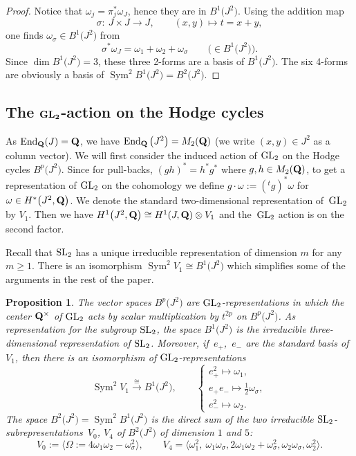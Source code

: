 \documentclass[10pt,a4paper]{amsart}
\numberwithin{equation}{section}
\newtheorem{Proposition}[Theorem]{Proposition}
 { \theoremstyle{definition}
\newtheorem{Definition}[Theorem]{Definition}
\newtheorem{Note}[Theorem]{Note}
\newtheorem{Example}[Theorem]{Example}
\newtheorem{Remark}[Theorem]{Remark} }
\begin{document}
\begin{proof}
Notice that $\omega_j=\pi_j^*\omega_J$, hence they are in $B^1\big(J^2\big)$. Using the addition map
\[
\sigma \colon \ J\times J \longrightarrow J,\qquad
(x,y)\longmapsto t=x+y,
\]
one finds $\omega_\sigma\in B^1\big(J^2\big)$ from
\[
\sigma^*\omega_J =
\omega_1+\omega_2+\omega_\sigma\qquad\big(\!\!\in B^1\big(J^2\big)\big).
\]
Since $\dim B^1\big(J^2\big)=3$, these three 2-forms are a basis of $B^1\big(J^2\big)$.
The six 4-forms are obviously a basis of $\operatorname{Sym}^2B^1\big(J^2\big)= B^2\big(J^2\big)$.
\end{proof}

\subsection[The GL\_2-action on the Hodge cycles]{The $\boldsymbol{{\rm GL}_2}$-action on the Hodge cycles}\label{GL2Hodge}

As $\operatorname{End}_{\bf Q}(J)={\bf Q}$, we have $\operatorname{End}_{\bf Q}\big(J^2\big)=M_2({\bf Q})$ (we write $(x,y)\in J^2$ as
a column vector).
We will first consider the induced action of ${\rm GL}_2$ on the Hodge cycles $B^p\big(J^2\big)$.
Since for pull-backs, $(gh)^*=h^*g^*$ where $g,h\in M_2({\bf Q})$, to get a representation
of ${\rm GL}_2$ on the cohomology we define
$g\cdot \omega:=({}^tg)^*\omega$ for $\omega\in H^*\big(J^2,{\bf Q}\big)$.
We denote the standard two-dimensional representation of~${\rm GL}_2$ by $V_1$. Then we
have $H^1\big(J^2,{\bf Q}\big)\cong H^1(J,{\bf Q})\otimes V_1$ and the~${\rm GL}_2$ action is on the second factor.

Recall that ${\rm SL}_2$ has a unique irreducible representation of dimension $m$ for any
$m\geq 1$. There is an isomorphism $\operatorname{Sym}^2V_1\cong B^1\big(J^2\big)$ which simplifies some of the arguments in
the rest of the paper.

\begin{Proposition} \label{GLB}\label{decGLB}
The vector spaces $B^p\big(J^2\big)$ are ${\rm GL}_2$-representations
in which the center ${\bf Q}^\times$ of ${\rm GL}_2$ acts by
scalar multiplication by $t^{2p}$ on $B^p\big(J^2\big)$.
As representation for the subgroup ${\rm SL}_2$,
the space $B^1\big(J^2\big)$ is the irreducible three-dimensional
representation of ${\rm SL}_2$. Moreover, if~$e_+$,~$e_-$ are the standard basis of $V_1$, then there
is an isomorphism of ${\rm GL}_2$-representations
\[
\operatorname{Sym}^2V_1 \stackrel{\cong}{\longrightarrow} B^1\big(J^2\big),
\qquad \begin{cases} e_+^2 \longmapsto \omega_1,\\
 e_+e_- \longmapsto \tfrac{1}{2}\omega_\sigma,\\
 e_-^2 \longmapsto \omega_2.
 \end{cases}
\]
The space $B^2\big(J^2\big)=\operatorname{Sym}^2B^1\big(J^2\big)$ is the direct sum of
the two irreducible ${\rm SL}_2$-subrepresen\-ta\-tions~$V_0$, $V_4$ of $B^2\big(J^2\big)$
of dimension $1$ and $5$:
\[
V_0 := \big\langle \Omega := 4\omega_1\omega_2 - \omega_\sigma^2 \big\rangle,
\qquad
V_4 =
\big\langle \omega_1^2,\ \omega_1\omega_\sigma,
2\omega_1\omega_2+\omega_\sigma^2,
\omega_2\omega_\sigma, \omega_2^2 \big\rangle.
\]
\end{Proposition}
\end{document}
